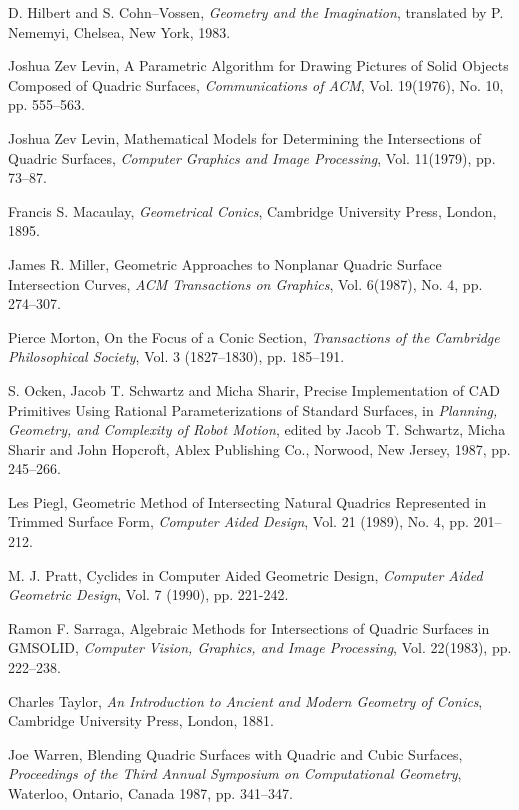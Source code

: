 \begin{thebibliography}{999}
     D. Hilbert and S. Cohn--Vossen,
     {\em Geometry and the Imagination},
     translated by P. Nememyi,
     Chelsea, New York, 1983.

     Joshua Zev Levin,
     A Parametric Algorithm for Drawing Pictures of Solid Objects Composed
          of Quadric Surfaces,
     {\em Communications of ACM},
     Vol. 19(1976), No. 10, pp. 555--563.

     Joshua Zev Levin,
     Mathematical Models for Determining the Intersections of Quadric Surfaces,
     {\em Computer Graphics and Image Processing},
     Vol. 11(1979), pp. 73--87.

     Francis S. Macaulay,
     {\em Geometrical Conics},
     Cambridge University Press, London, 1895.

     James R. Miller,
     Geometric Approaches to Nonplanar Quadric Surface Intersection Curves,
     {\em ACM Transactions on Graphics},
     Vol. 6(1987), No. 4, pp. 274--307.

     Pierce Morton,
     On the Focus of a Conic Section,
     {\em Transactions of the Cambridge Philosophical Society},
     Vol. 3 (1827--1830), pp. 185--191.

     S. Ocken, Jacob T. Schwartz and Micha Sharir,
     Precise Implementation of CAD Primitives Using Rational Parameterizations
     of Standard Surfaces,
     in {\em Planning, Geometry, and Complexity of Robot Motion}, edited by
     Jacob T. Schwartz, Micha Sharir and John Hopcroft,
     Ablex Publishing Co., Norwood, New Jersey, 1987, pp. 245--266.

     Les Piegl,
     Geometric Method of Intersecting Natural Quadrics Represented in
     Trimmed Surface Form,
     {\em Computer Aided Design}, Vol. 21 (1989), No. 4, pp. 201--212.

     M. J. Pratt,
     Cyclides in Computer Aided Geometric Design,
     {\em Computer Aided Geometric Design},
     Vol. 7 (1990), pp. 221-242.

     Ramon F. Sarraga,
     Algebraic Methods for Intersections of Quadric Surfaces in GMSOLID,
     {\em Computer Vision, Graphics, and Image Processing},
     Vol. 22(1983), pp. 222--238.

     Charles Taylor,
     {\em An Introduction to Ancient and Modern Geometry of Conics},
     Cambridge University Press, London, 1881.

     Joe Warren,
     Blending Quadric Surfaces with Quadric and Cubic Surfaces,
     {\em Proceedings of the Third Annual Symposium on Computational Geometry},
     Waterloo, Ontario, Canada 1987, pp. 341--347.

\end{thebibliography}



